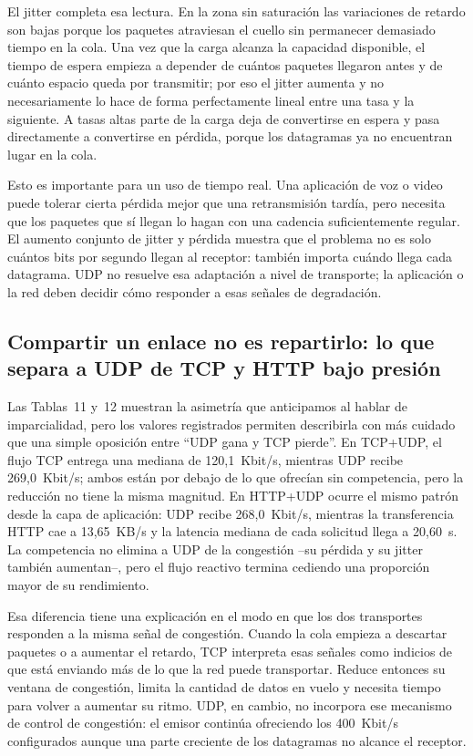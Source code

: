 \documentclass[11pt,a4paper]{article}
\begin{document}
El jitter completa esa lectura. En la zona sin saturaci\'on las variaciones de retardo son bajas porque los paquetes atraviesan el cuello sin permanecer demasiado tiempo en la cola. Una vez que la carga alcanza la capacidad disponible, el tiempo de espera empieza a depender de cu\'antos paquetes llegaron antes y de cu\'anto espacio queda por transmitir; por eso el jitter aumenta y no necesariamente lo hace de forma perfectamente lineal entre una tasa y la siguiente. A tasas altas parte de la carga deja de convertirse en espera y pasa directamente a convertirse en p\'erdida, porque los datagramas ya no encuentran lugar en la cola.

Esto es importante para un uso de tiempo real. Una aplicaci\'on de voz o video puede tolerar cierta p\'erdida mejor que una retransmisi\'on tard\'ia, pero necesita que los paquetes que s\'i llegan lo hagan con una cadencia suficientemente regular. El aumento conjunto de jitter y p\'erdida muestra que el problema no es solo cu\'antos bits por segundo llegan al receptor: tambi\'en importa cu\'ando llega cada datagrama. UDP no resuelve esa adaptaci\'on a nivel de transporte; la aplicaci\'on o la red deben decidir c\'omo responder a esas se\~nales de degradaci\'on.

\subsection*{Compartir un enlace no es repartirlo: lo que separa a UDP de TCP y HTTP bajo presi\'on}

Las Tablas~11 y~12 muestran la asimetr\'ia que anticipamos al hablar de imparcialidad, pero los valores registrados permiten describirla con m\'as cuidado que una simple oposici\'on entre ``UDP gana y TCP pierde''. En TCP+UDP, el flujo TCP entrega una mediana de 120,1~Kbit/s, mientras UDP recibe 269,0~Kbit/s; ambos est\'an por debajo de lo que ofrec\'ian sin competencia, pero la reducci\'on no tiene la misma magnitud. En HTTP+UDP ocurre el mismo patr\'on desde la capa de aplicaci\'on: UDP recibe 268,0~Kbit/s, mientras la transferencia HTTP cae a 13,65~KB/s y la latencia mediana de cada solicitud llega a 20,60~s. La competencia no elimina a UDP de la congesti\'on --su p\'erdida y su jitter tambi\'en aumentan--, pero el flujo reactivo termina cediendo una proporci\'on mayor de su rendimiento.

Esa diferencia tiene una explicaci\'on en el modo en que los dos transportes responden a la misma se\~nal de congesti\'on. Cuando la cola empieza a descartar paquetes o a aumentar el retardo, TCP interpreta esas se\~nales como indicios de que est\'a enviando m\'as de lo que la red puede transportar. Reduce entonces su ventana de congesti\'on, limita la cantidad de datos en vuelo y necesita tiempo para volver a aumentar su ritmo. UDP, en cambio, no incorpora ese mecanismo de control de congesti\'on: el emisor contin\'ua ofreciendo los 400~Kbit/s configurados aunque una parte creciente de los datagramas no alcance el receptor.
\end{document}

